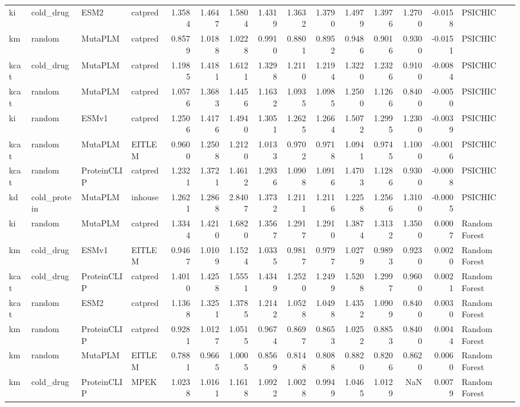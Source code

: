 \begin{tabular}{llllrrrrrrrrrrl}
ki & cold_drug & ESM2 & catpred & 1.3584 & 1.4647 & 1.5804 & 1.4319 & 1.3632 & 1.3790 & 1.4979 & 1.3976 & 1.2700 & -0.0158 & PSICHIC \\
km & random & MutaPLM & catpred & 0.8579 & 1.0188 & 1.0228 & 0.9910 & 0.8801 & 0.8952 & 0.9486 & 0.9016 & 0.9300 & -0.0151 & PSICHIC \\
kcat & cold_drug & MutaPLM & catpred & 1.1985 & 1.4181 & 1.6121 & 1.3298 & 1.2110 & 1.2194 & 1.3220 & 1.2326 & 0.9100 & -0.0084 & PSICHIC \\
kcat & random & MutaPLM & catpred & 1.0576 & 1.3683 & 1.4456 & 1.1632 & 1.0935 & 1.0985 & 1.2500 & 1.1266 & 0.8400 & -0.0050 & PSICHIC \\
ki & random & ESMv1 & catpred & 1.2506 & 1.4176 & 1.4940 & 1.3051 & 1.2625 & 1.2664 & 1.5072 & 1.2995 & 1.2300 & -0.0039 & PSICHIC \\
kcat & random & MutaPLM & EITLEM & 0.9600 & 1.2508 & 1.2120 & 1.0133 & 0.9702 & 0.9718 & 1.0941 & 0.9745 & 1.1000 & -0.0016 & PSICHIC \\
kcat & random & ProteinCLIP & catpred & 1.2321 & 1.3721 & 1.4612 & 1.2936 & 1.0908 & 1.0916 & 1.4703 & 1.1286 & 0.9300 & -0.0008 & PSICHIC \\
kd & cold_protein & MutaPLM & inhouse & 1.2621 & 1.2868 & 2.8407 & 1.3732 & 1.2111 & 1.2116 & 1.2258 & 1.2566 & 1.3100 & -0.0005 & PSICHIC \\
ki & random & MutaPLM & catpred & 1.3344 & 1.4210 & 1.6820 & 1.3567 & 1.2917 & 1.2910 & 1.3874 & 1.3132 & 1.3500 & 0.0007 & Random Forest \\
km & cold_drug & ESMv1 & EITLEM & 0.9467 & 1.0109 & 1.1524 & 1.0335 & 0.9817 & 0.9797 & 1.0279 & 0.9893 & 0.9230 & 0.0020 & Random Forest \\
kcat & cold_drug & ProteinCLIP & catpred & 1.4010 & 1.4258 & 1.5551 & 1.4349 & 1.2520 & 1.2499 & 1.5208 & 1.2997 & 0.9600 & 0.0021 & Random Forest \\
kcat & random & ESM2 & catpred & 1.1368 & 1.3251 & 1.3785 & 1.2142 & 1.0528 & 1.0498 & 1.4352 & 1.0909 & 0.8400 & 0.0030 & Random Forest \\
km & random & ProteinCLIP & catpred & 0.9281 & 1.0127 & 1.0515 & 0.9674 & 0.8697 & 0.8653 & 1.0252 & 0.8853 & 0.8400 & 0.0044 & Random Forest \\
km & random & MutaPLM & EITLEM & 0.7881 & 0.9665 & 1.0005 & 0.8569 & 0.8148 & 0.8088 & 0.8820 & 0.8206 & 0.8620 & 0.0060 & Random Forest \\
km & cold_drug & ProteinCLIP & MPEK & 1.0238 & 1.0161 & 1.1618 & 1.0922 & 1.0028 & 0.9949 & 1.0465 & 1.0129 & NaN & 0.0079 & Random Forest \\

\end{tabular}
